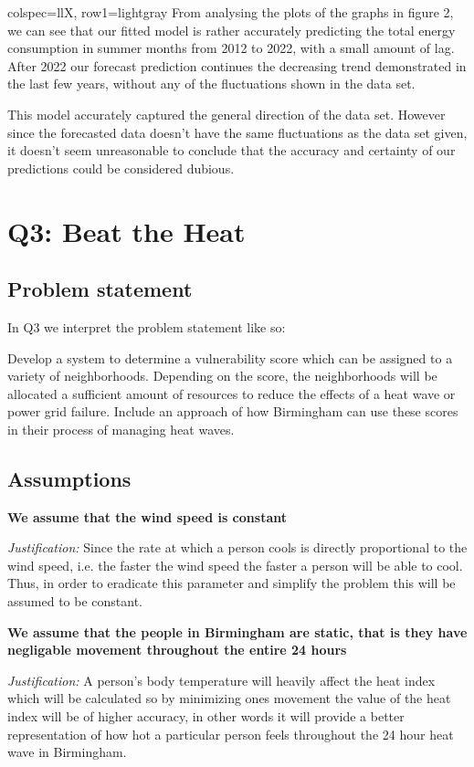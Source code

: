 \documentclass[11pt]{article}
\begin{document}
\begin{longtblr}[
  caption={Variables and parameters.}
]{
  colspec={llX},
  row{1}={lightgray}
}
From analysing the plots of the graphs in figure 2, we can see that our fitted model is rather accurately predicting the
total energy consumption in summer months from 2012 to 2022, with a small amount of lag. After 2022 our forecast prediction
continues the decreasing trend demonstrated in the last few years, without any of the fluctuations shown in the data set.

This model accurately captured the general direction of the data set. However since the forecasted data doesn't have the same
fluctuations as the data set given, it doesn't seem unreasonable to conclude that the accuracy and certainty of our
predictions could be considered dubious.

\section{Q3: Beat the Heat}
\subsection{Problem statement}

In Q3 we interpret the problem statement like so:

Develop a system to determine a vulnerability score which can be assigned to a  variety of neighborhoods. Depending on the score, the neighborhoods will be allocated a sufficient amount of resources to reduce the effects of a heat wave or power grid failure. Include an approach of how Birmingham can use these scores in their process of managing heat waves.

\subsection{Assumptions}
\textbf{\sffamily We assume that the wind speed is constant}

\textit{Justification:} Since the rate at which a person cools is directly proportional to the wind speed, i.e. the faster the wind speed the faster a person will be able to cool. Thus, in order to eradicate this parameter and simplify the problem this will be assumed to be constant.

\noindent
\textbf{\sffamily We assume that the people in Birmingham are static, that is they have negligable movement throughout the entire 24 hours}

\textit{Justification:} A person's body temperature will heavily affect the heat index which will be calculated so by minimizing ones movement the value of the heat index will be of higher accuracy, in other words it will provide a better representation of how hot a particular person feels throughout the 24 hour heat wave in Birmingham. 


\end{longtblr}
\end{document}
